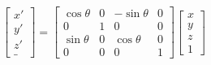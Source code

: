 \documentclass{article}
\begin{document}
\begin{gather}
		\begin{bmatrix}
		x'\\
		y'\\
		z'\\
		\_
	\end{bmatrix}
	=
	\begin{bmatrix}
		\cos \theta & 0 & -\sin \theta & 0\\
		0           & 1 & 0            & 0\\
		\sin \theta & 0 &  \cos \theta & 0\\
		0           & 0 & 0            & 1
	\end{bmatrix}
	\begin{bmatrix}
		x\\
		y\\
		z\\
		1
	\end{bmatrix}
\end{gather}
\end{document}
